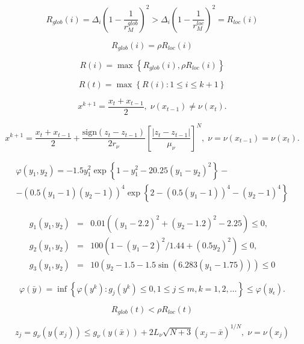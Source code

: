 \documentclass[review]{elsarticle}
\begin{document}
\begin{equation}\label{R_glob_greater_R_loc}
	R_{glob}(i)=\Delta_i\left(1-\frac{1}{r_M^{glob}} \right)^2 > \Delta_i\left(1-\frac{1}{r_M^{loc}} \right)^2 = R_{loc}(i)
\end{equation}

\begin{equation}\label{R_glob_equal_R_loc}
	R_{glob}(i) = \rho R_{loc}(i)
\end{equation}

\begin{equation}\label{R_max}
	R(i) = \max{\left\{ R_{glob}(i), \rho R_{loc}(i) \right\}}
\end{equation}

\begin{equation}\label{R_max_t}
	R(t) = \max{\left\{ R(i): 1 \leq i \leq k+1\right\}}
\end{equation}

\[
	x^{k+1} = \frac{x_t + x_{t-1}}{2}, \; \nu(x_{t-1}) \neq \nu(x_t).
\]

\[
	x^{k+1} = \frac{x_t+x_{t-1}}{2} + \frac{\mathrm{sign}(z_t-z_{t-1})}{2r_\nu}\left[\frac{\left|z_t-z_{t-1}\right|}{\mu_\nu}\right]^N, \; \nu=\nu(x_{t-1})=\nu(x_t).
\]

\begin{eqnarray}
	\varphi(y_1, y_2)=-1.5y_1^2\exp{\left\{1-y_1^2-20.25(y_1-y_2)^2\right\}}- \nonumber \\
	-\left(0.5(y_1-1)(y_2-1)\right)^4\exp{\left\{2-\left(0.5(y_1-1)\right)^4-(y_2-1)^4\right\}}
	\nonumber
\end{eqnarray}

\begin{eqnarray}
	g_1(y_1, y_2) &=& 0.01 \left( (y_1-2.2)^2+(y_2-1.2)^2-2.25 \right) \leq 0, \nonumber \\
	g_2(y_1, y_2) &=& 100 \left(1-(y_1-2)^2/1.44+(0.5y_2)^2 \right) \leq 0, \nonumber \\
	g_3(y_1, y_2) &=& 10 \left( y_2 - 1.5 - 1.5 \sin{\left( 6.283(y_1-1.75) \right)}\right) \leq 0
	\nonumber
\end{eqnarray}

\begin{equation}\label{phi_bar_y}
	\varphi(\bar y) = \inf\left\{\varphi(y^k):g_j(y^k) \leq 0, 1 \leq j \leq m, k = 1,2,\ldots \right\} \leq \varphi(y_{\epsilon}).
\end{equation}

\[
	R_{glob}(t) < \rho R_{loc}(t)
\]

\[
	z_j=g_{\nu}\left( y(x_j) \right) \leq g_{\nu}\left( y(\bar x) \right) + 2L_{\nu}\sqrt{N+3}(x_j-\bar x)^{1/N}, \; \nu=\nu(x_j)
\]
\end{document}

